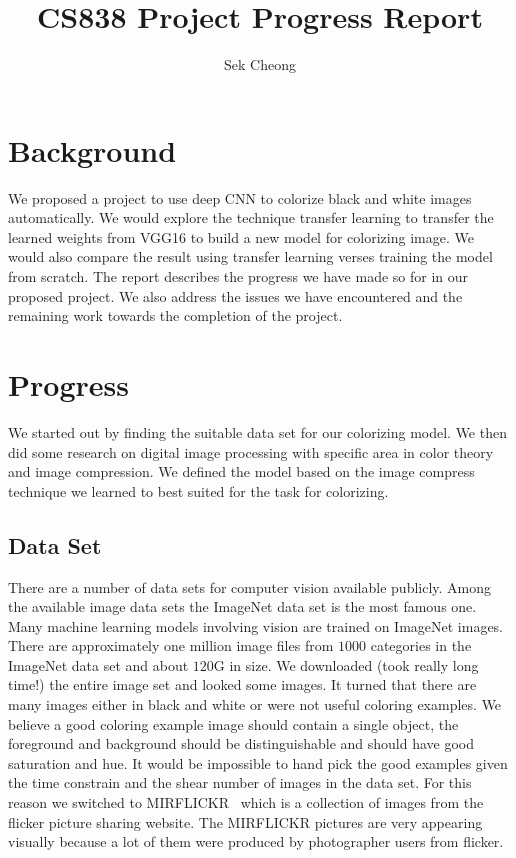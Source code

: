 \documentclass[12pt]{article}
\begin{document}
\title{CS838 Project Progress Report}
\author{Sek Cheong}
\maketitle

\section{Background}
We proposed a project to use deep CNN to colorize black and white images automatically. We would explore the technique transfer learning to transfer the learned weights from VGG16 to build a new model for colorizing image. We would also compare the result using transfer learning verses training the model from scratch. The report describes the progress we have made so for in our proposed project. We also address the issues we have encountered and the remaining work towards the completion of the project. 


\section{Progress}
We started out by finding the suitable data set for our colorizing model. We then did some research on digital image processing with specific area in color theory and image compression. We defined the model based on the image compress technique we learned to best suited for the task for colorizing.

\subsection{Data Set}
There are a number of data sets for computer vision available publicly. Among the available image data sets the ImageNet data set is the most famous one. Many machine learning models involving vision are trained on ImageNet images. There are approximately one million image files from $1000$ categories in the ImageNet data set and about $120$G in size. We downloaded (took really long time!) the entire image set and looked some images. It turned that there are many images either in black and white or were not useful coloring examples. We believe a good coloring example image should contain a single object, the foreground and background should be distinguishable and should have good saturation and hue. It would be impossible to hand pick the good examples given the time constrain and the shear number of images in the data set. For this reason we switched to MIRFLICKR~\cite{MIR08} which is a collection of images from the flicker picture sharing website. The MIRFLICKR pictures are very appearing visually because a lot of them were produced by photographer users from flicker. 
\end{document}

